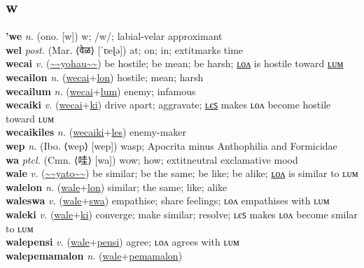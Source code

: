 \subsection{w}

\textbf{'we} \textit{n.} (ono. [w])
w; /w/; labial-velar approximant \label{'we} \\
\textbf{wel} \textit{post.} (Mar. ⟨वेळ⟩ [ˈʋeɭə])
at; on; in; 	extit{marks time} \label{wel} \\
\textbf{wecai} \textit{v.} (\hyperref[yohau]{\~{}\~{}yohau\~{}\~{}})
be hostile; be mean; be harsh; \hyperref[wecailon]{ʟᴏᴧ} is hostile toward \hyperref[wecailum]{ʟᴜᴍ} \label{wecai} \\
\textbf{wecailon} \textit{n.} (\hyperref[wecai]{wecai}+\hyperref[lon]{lon})
hostile; mean; harsh \label{wecailon} \\
\textbf{wecailum} \textit{n.} (\hyperref[wecai]{wecai}+\hyperref[lum]{lum})
enemy; infamous \label{wecailum} \\
\textbf{wecaiki} \textit{v.} (\hyperref[wecai]{wecai}+\hyperref[ki]{ki})
drive apart; aggravate; \hyperref[wecaikiles]{ʟєꜱ} makes ʟᴏᴧ become hostile toward ʟᴜᴍ \label{wecaiki} \\
\textbf{wecaikiles} \textit{n.} (\hyperref[wecaiki]{wecaiki}+\hyperref[les]{les})
enemy-maker \label{wecaikiles} \\
\textbf{wep} \textit{n.} (Ibo. ⟨wep⟩ [wep])
wasp; Apocrita minus Anthophilia and Formicidae \label{wep} \\
\textbf{wa} \textit{ptcl.} (Cmn. ⟨哇⟩ [wa])
wow; how; 	extit{neutral exclamative mood} \label{wa} \\
\textbf{wale} \textit{v.} (\hyperref[yato]{\~{}\~{}yato\~{}\~{}})
be similar; be the same; be like; be alike; \hyperref[walelon]{ʟᴏᴧ} is similar to ʟᴜᴍ \label{wale} \\
\textbf{walelon} \textit{n.} (\hyperref[wale]{wale}+\hyperref[lon]{lon})
similar; the same; like; alike \label{walelon} \\
\textbf{waleswa} \textit{v.} (\hyperref[wale]{wale}+\hyperref[swa]{swa})
empathise; share feelings; ʟᴏᴧ empathises with ʟᴜᴍ \label{waleswa} \\
\textbf{waleki} \textit{v.} (\hyperref[wale]{wale}+\hyperref[ki]{ki})
converge; make similar; resolve; ʟєꜱ makes ʟᴏᴧ become smilar to ʟᴜᴍ \label{waleki} \\
\textbf{walepensi} \textit{v.} (\hyperref[wale]{wale}+\hyperref[pensi]{pensi})
agree; ʟᴏᴧ agrees with ʟᴜᴍ \label{walepensi} \\
\textbf{walepemamalon} \textit{n.} (\hyperref[wale]{wale}+\hyperref[pemamalon]{pemamalon})
